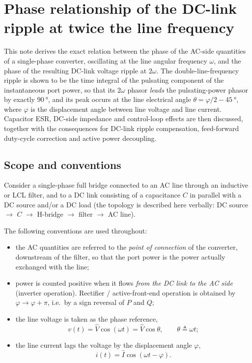 \chapter{Phase relationship of the DC-link ripple at twice the line frequency}
\label{ch:dcripple}
\begin{chapabstract}
This note derives the exact relation between the phase of the AC-side quantities
of a single-phase converter, oscillating at the line angular frequency $\omega$,
and the phase of the resulting DC-link voltage ripple at $2\omega$. The
double-line-frequency ripple is shown to be the time integral of the pulsating
component of the instantaneous port power, so that its $2\omega$ phasor
\emph{leads} the pulsating-power phasor by exactly $\SI{90}{\degree}$, and its
peak occurs at the line electrical angle $\theta = \varphi/2 - \SI{45}{\degree}$,
where $\varphi$ is the displacement angle between line voltage and line current.
Capacitor ESR, DC-side impedance and control-loop effects are then discussed,
together with the consequences for DC-link ripple compensation, feed-forward
duty-cycle correction and active power decoupling.
\end{chapabstract}

\section{Scope and conventions}

Consider a single-phase full bridge connected to an AC line through an inductive
or LCL filter, and to a DC link consisting of a capacitance $C$ in parallel with
a DC source and/or a DC load (the topology is described here verbally:
DC source $\rightarrow$ $C$ $\rightarrow$ H-bridge $\rightarrow$ filter
$\rightarrow$ AC line).

The following conventions are used throughout:

\begin{itemize}
  \item the AC quantities are referred to the \emph{point of connection} of the
        converter, downstream of the filter, so that the port power is the power
        actually exchanged with the line;
  \item power is counted positive when it flows \emph{from the DC link to the AC
        side} (inverter operation). Rectifier / active-front-end operation is
        obtained by $\varphi \rightarrow \varphi + \pi$, i.e.\ by a sign
        reversal of $P$ and $Q$;
  \item the line voltage is taken as the phase reference,
        \begin{equation}
          v(t) = \hat V \cos(\omega t) = \hat V \cos \theta ,
          \qquad \theta \triangleq \omega t ;
        \end{equation}
  \item the line current lags the voltage by the displacement angle $\varphi$,
        \begin{equation}
          i(t) = \hat I \cos(\omega t - \varphi) .
        \end{equation}
\end{itemize}

